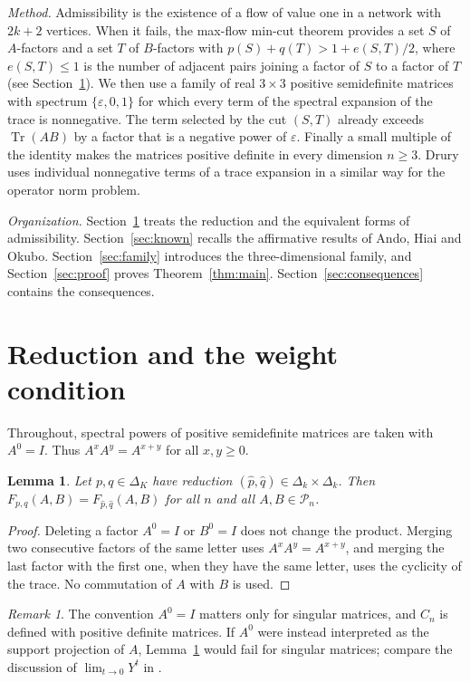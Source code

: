 \documentclass{amsart}
\newtheorem{lemma}[theorem]{Lemma}
\theoremstyle{definition}
\theoremstyle{remark}
\newtheorem{remark}[theorem]{Remark}
\numberwithin{equation}{section}
\newcommand{\Tr}{\operatorname{Tr}}
\newcommand{\PSD}{\mathcal{P}_n}
\begin{document}
\emph{Method.} Admissibility is the existence of a flow of value one in a network with $2k+2$ vertices. When it fails, the max-flow min-cut theorem provides a set $S$ of $A$-factors and a set $T$ of $B$-factors with $p(S)+q(T)>1+e(S,T)/2$, where $e(S,T)\le 1$ is the number of adjacent pairs joining a factor of $S$ to a factor of $T$ (see Section~\ref{sec:reduction}). We then use a family of real $3\times 3$ positive semidefinite matrices with spectrum $\{\varepsilon,0,1\}$ for which every term of the spectral expansion of the trace is nonnegative. The term selected by the cut $(S,T)$ already exceeds $\Tr(AB)$ by a factor that is a negative power of $\varepsilon$. Finally a small multiple of the identity makes the matrices positive definite in every dimension $n\ge 3$. Drury \cite{Dr} uses individual nonnegative terms of a trace expansion in a similar way for the operator norm problem.

\emph{Organization.} Section~\ref{sec:reduction} treats the reduction and the equivalent forms of admissibility. Section~\ref{sec:known} recalls the affirmative results of Ando, Hiai and Okubo. Section~\ref{sec:family} introduces the three-dimensional family, and Section~\ref{sec:proof} proves Theorem~\ref{thm:main}. Section~\ref{sec:consequences} contains the consequences.

\section{Reduction and the weight condition}\label{sec:reduction}

Throughout, spectral powers of positive semidefinite matrices are taken with $A^0=I$. Thus $A^xA^y=A^{x+y}$ for all $x,y\ge 0$.

\begin{lemma}\label{lem:reduction}
Let $p,q\in\Delta_K$ have reduction $(\hat p,\hat q)\in\Delta_k\times\Delta_k$. Then $F_{p,q}(A,B)=F_{\hat p,\hat q}(A,B)$ for all $n$ and all $A,B\in\PSD$.
\end{lemma}

\begin{proof}
Deleting a factor $A^0=I$ or $B^0=I$ does not change the product. Merging two consecutive factors of the same letter uses $A^xA^y=A^{x+y}$, and merging the last factor with the first one, when they have the same letter, uses the cyclicity of the trace. No commutation of $A$ with $B$ is used.
\end{proof}

\begin{remark}\label{rem:zero}
The convention $A^0=I$ matters only for singular matrices, and $C_n$ is defined with positive definite matrices. If $A^0$ were instead interpreted as the support projection of $A$, Lemma~\ref{lem:reduction} would fail for singular matrices; compare the discussion of $\lim_{t\to 0}Y^t$ in \cite[Section~IV]{CL}.
\end{remark}
\end{document}
